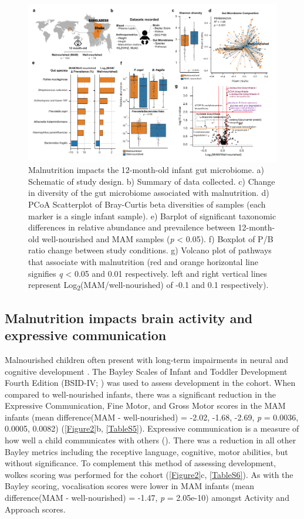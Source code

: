 \documentclass{article}
\begin{document}
\begin{figure}[!htb]
\centering
\includegraphics[scale=0.9]{../../figures/Figure1-microbiome.pdf}
\caption[Malnutrition impacts the 12-month-old infant gut microbiome]{
	Malnutrition impacts the 12-month-old infant gut microbiome.
	a) Schematic of study design.
	b) Summary of data collected.
	c) Change in diversity of the gut microbiome associated with malnutrition.
	d) PCoA Scatterplot of Bray-Curtis beta diversities of samples (each marker is a single infant sample).
	e) Barplot of significant taxonomic differences in relative abundance and prevailence between 12-month-old well-nourished and \gls{MAM} samples (\textit{p} \textless{} 0.05).
	f) Boxplot of \gls{P/B} ratio change between study conditions.
	g) Volcano plot of pathways that associate with malnutrition (red and orange horizontal line signifies \textit{q} \textless{} 0.05 and 0.01 respectively. left and right vertical lines represent Log\textsubscript{2}(\gls{MAM}/well-nourished) of -0.1 and 0.1 respectively).}
\label{Figure1}
\end{figure}

\subsection*{Malnutrition impacts brain activity and expressive communication}
Malnourished children often present with long-term impairments in neural and cognitive development \cite{martins2011long}.
The Bayley Scales of Infant and Toddler Development Fourth Edition (BSID-IV; \cite{Bayley2019}) was used to assess development in the cohort.
When compared to well-nourished infants, there was a significant reduction in the Expressive Communication, Fine Motor, and Gross Motor scores in the \gls{MAM} infants (mean difference(\gls{MAM} - well-nourished) = -2.02, -1.68, -2.69, \textit{p} = 0.0036, 0.0005, 0.0082) (\autoref{Figure2}b, \autoref{TableS5}).
Expressive communication is a measure of how well a child communicates with others ().
There was a reduction in all other Bayley metrics including the receptive language, cognitive, motor abilities, but without significance.
To complement this method of assessing development, wolkes scoring was performed for the cohort (\autoref{Figure2}c, \autoref{TableS6}).
As with the Bayley scoring, vocalisation scores were lower in \gls{MAM} infants (mean difference(\gls{MAM} - well-nourished) = -1.47, \textit{p} = 2.05e-10) amongst Activity and Approach scores.
\end{document}
